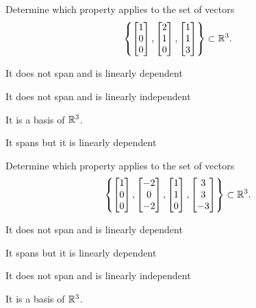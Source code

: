\begin{readinessAssuranceTest}
\item Determine which property applies to the set of vectors $$\left\{ \begin{bmatrix}  1 \\ 0 \\ 0 \end{bmatrix}, \begin{bmatrix} 2 \\ 1 \\ 0 \end{bmatrix} , \begin{bmatrix} 1 \\ 1 \\ 3 \end{bmatrix} \right\}\subset \mathbb{R}^3.$$
\begin{readinessAssuranceTestChoices}
\item It does not span and is linearly dependent
\item It does not span and is linearly independent
\item It is a basis of $\mathbb{R}^3$. %
\item It spans but it is linearly dependent
\end{readinessAssuranceTestChoices}


\item Determine which property applies to the set of vectors $$\left\{ \begin{bmatrix}  1 \\ 0 \\ 0 \end{bmatrix}, \begin{bmatrix} -2 \\ 0 \\ -2 \end{bmatrix} , \begin{bmatrix} 1 \\ 1 \\ 0 \end{bmatrix} , \begin{bmatrix} 3 \\ 3 \\ -3 \end{bmatrix}\right\}\subset \mathbb{R}^3.$$
\begin{readinessAssuranceTestChoices}
\item It does not span and is linearly dependent
\item It spans but it is linearly dependent %
\item It does not span and is linearly independent
\item It is a basis of $\mathbb{R}^3$.
\end{readinessAssuranceTestChoices}



\end{readinessAssuranceTest}
